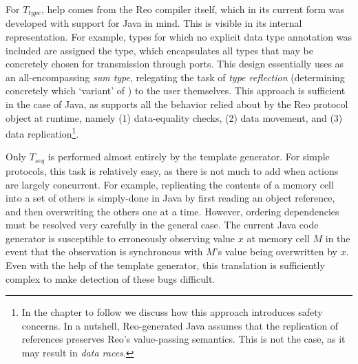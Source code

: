 For $T_{type}$, help comes from the Reo compiler itself, which in its current form was developed with support for Java in mind. This is visible in its internal representation. For example, types for which no explicit data type annotation was included are assigned the  type, which encapsulates all types that may be concretely chosen for transmission through ports. This design essentially uses  as an all-encompassing \textit{sum type}, relegating the task of \textit{type reflection} (determining concretely which `variant' of ) to the user themselves. This approach is sufficient in the case of Java, as  supports all the behavior relied about by the Reo protocol object at runtime, namely (1) data-equality checks, (2) data movement, and (3) data replication\footnote{In the chapter to follow we discuss how this approach introduces safety concerns. In a nutshell, Reo-generated Java assumes that the replication of  references preserves Reo's value-passing semantics. This is not the case, as it may result in \textit{data races}.}.

Only $T_{seq}$ is performed almost entirely by the template generator. For simple protocols, this task is relatively easy, as there is not much to add when actions are largely concurrent. For example, replicating the contents of a memory cell into a set of others is simply-done in Java by first reading an object reference, and then overwriting the others one at a time. However, ordering dependencies must be resolved very carefully in the general case. The current Java code generator is susceptible to erroneously observing value $x$ at memory cell $M$ in the event that the observation is synchronous with $M$'s value being overwritten by $x$. Even with the help of the template generator, this translation is sufficiently complex to make detection of these bugs difficult.

